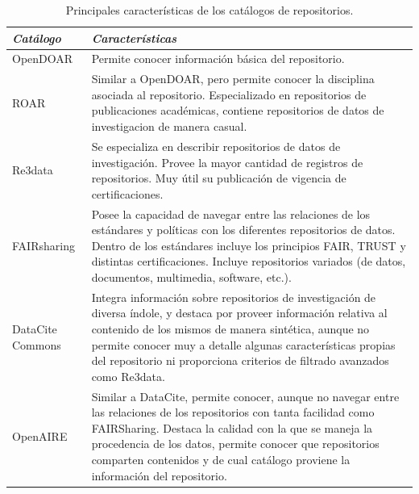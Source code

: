 \documentclass[runningheads]{llncs}
\begin{document}
\small
\begin{table}[h]
\centering
    \begin{tabular}{l | p{11cm}}
    \emph{Catálogo} & \emph{Características}\\
    \hline
    OpenDOAR & Permite conocer información básica del repositorio. \\ \hline
    ROAR &  Similar a  OpenDOAR, pero permite conocer la disciplina asociada al repositorio. Especializado en repositorios de publicaciones académicas, contiene repositorios de datos de investigacion de manera casual. \\ \hline
    Re3data & Se especializa en describir repositorios de datos de investigación. Provee la mayor cantidad de registros de repositorios. Muy útil su publicación de vigencia de certificaciones.  \\ \hline
    FAIRsharing & Posee la capacidad de navegar entre las relaciones de los estándares y políticas con los diferentes repositorios de datos. Dentro de los estándares incluye los principios FAIR, TRUST y distintas certificaciones. Incluye repositorios variados (de datos, documentos, multimedia, software, etc.). \\ \hline
    DataCite Commons & Integra información sobre repositorios de investigación de diversa índole, y destaca por proveer información relativa al contenido de los mismos de manera sintética, aunque no permite conocer muy a detalle algunas características propias del repositorio ni proporciona criterios de filtrado avanzados como Re3data. \\ \hline
    OpenAIRE & Similar a DataCite, permite conocer, aunque no navegar entre las relaciones de los repositorios con tanta facilidad como FAIRSharing. Destaca la calidad con la que se maneja la procedencia de los datos, permite conocer que repositorios comparten contenidos y de cual catálogo proviene la información del repositorio.\\ \hline
    \end{tabular}
    \caption{\label{tab:catalog_main_features}Principales características de los catálogos de repositorios.}
\end{table}
\normalsize


\end{document}
